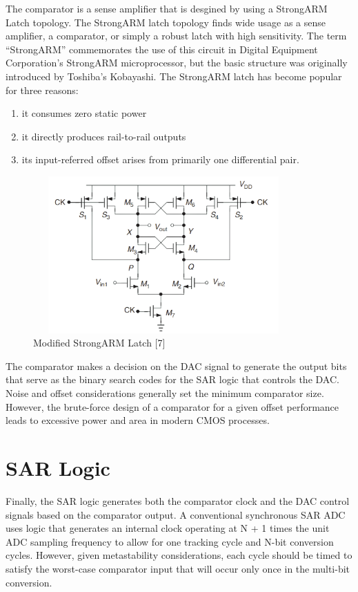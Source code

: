 The comparator is a sense amplifier that is desgined by using a StrongARM Latch topology. The StrongARM latch topology finds 
wide usage as a sense amplifier, 
a comparator, or simply a robust 
latch with high sensitivity. The term 
“StrongARM” commemorates the use 
of this circuit in Digital Equipment 
Corporation’s StrongARM microprocessor, but the basic structure was 
originally introduced by Toshiba’s 
Kobayashi. The StrongARM 
latch has become popular for three 
reasons: 
\begin{enumerate}[1.]
	\item it consumes zero static power
	\item it directly produces rail-to-rail outputs
	\item its input-referred offset arises from primarily one differential pair.
\end{enumerate}

\begin{figure}[h]
	\centering
	\includegraphics[width=10cm,height=6cm]{fig3_4.png}
	\caption{Modified StrongARM Latch [7]}
	\label{SAL}
\end{figure}

The comparator makes a decision 
on the DAC signal to generate the output bits that serve as the binary search 
codes for the SAR logic that controls 
the DAC. Noise 
and offset considerations generally set 
the minimum comparator size. However, the brute-force design of a comparator for a given offset performance 
leads to excessive power and area in 
modern CMOS processes.

\newpage
\section{SAR Logic}

Finally, the SAR logic generates both 
the comparator clock and the DAC control signals based on the comparator 
output. A conventional synchronous 
SAR ADC uses logic that generates an 
internal clock operating at N + 1 times 
the unit ADC sampling frequency to 
allow for one tracking cycle and N-bit 
conversion cycles. However, given 
metastability considerations, each cycle should be timed to satisfy the worst-case comparator input that will occur 
only once in the multi-bit conversion.